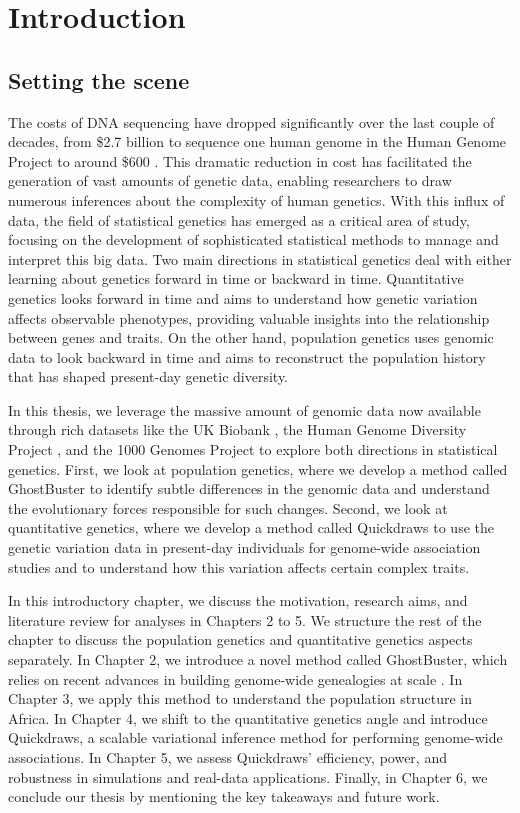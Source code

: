 \chapter{\label{ch:1-intro}Introduction} 

\minitoc

\section{Setting the scene}

The costs of DNA sequencing have dropped significantly over the last couple of decades, from \$2.7 billion to sequence one human genome in the Human Genome Project \cite{Collins2003} to around \$600 \cite{Wetterstrand2022}. This dramatic reduction in cost has facilitated the generation of vast amounts of genetic data, enabling researchers to draw numerous inferences about the complexity of human genetics. With this influx of data, the field of statistical genetics has emerged as a critical area of study, focusing on the development of sophisticated statistical methods to manage and interpret this big data. Two main directions in statistical genetics deal with either learning about genetics forward in time or backward in time. Quantitative genetics looks forward in time and aims to understand how genetic variation affects observable phenotypes, providing valuable insights into the relationship between genes and traits. On the other hand, population genetics uses genomic data to look backward in time and aims to reconstruct the population history that has shaped present-day genetic diversity.

In this thesis, we leverage the massive amount of genomic data now available through rich datasets like the UK Biobank \cite{Bycroft2018}, the Human Genome Diversity Project \cite{Cann2002}, and the 1000 Genomes Project \cite{10002015} to explore both directions in statistical genetics. First, we look at population genetics, where we develop a method called GhostBuster to identify subtle differences in the genomic data and understand the evolutionary forces responsible for such changes. Second, we look at quantitative genetics, where we develop a method called Quickdraws to use the genetic variation data in present-day individuals for genome-wide association studies and to understand how this variation affects certain complex traits.

In this introductory chapter, we discuss the motivation, research aims, and literature review for analyses in Chapters 2 to 5. We structure the rest of the chapter to discuss the population genetics and quantitative genetics aspects separately. In Chapter 2, we introduce a novel method called GhostBuster, which relies on recent advances in building genome-wide genealogies at scale \cite{Speidel2019, Kelleher2019, zhang2023biobank}. In Chapter 3, we apply this method to understand the population structure in Africa. In Chapter 4, we shift to the quantitative genetics angle and introduce Quickdraws, a scalable variational inference method for performing genome-wide associations. In Chapter 5, we assess Quickdraws' efficiency, power, and robustness in simulations and real-data applications. Finally, in Chapter 6, we conclude our thesis by mentioning the key takeaways and future work.

